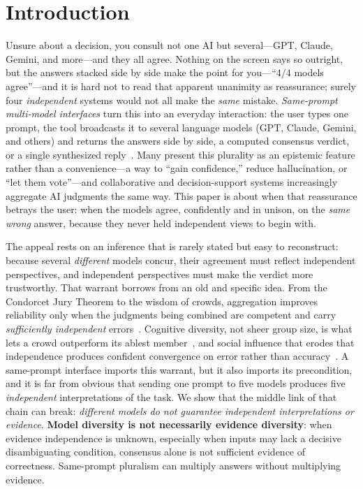 \documentclass[acmsmall,screen,review,anonymous]{acmart}
\begin{document}
\section{Introduction}
\label{sec:intro}
Unsure about a decision, you consult not one AI but several---GPT, Claude, Gemini, and more---and they all
agree. Nothing on the screen says so outright, but the answers stacked side by side make the point for
you---``$4/4$ models agree''---and it is hard not to read that apparent unanimity
as reassurance; surely four \emph{independent} systems would not all make the \emph{same} mistake.
\emph{Same-prompt multi-model interfaces} turn this into an everyday interaction: the user types one prompt,
the tool broadcasts it to several language models (GPT, Claude, Gemini, and others) and returns the answers
side by side, a computed consensus verdict, or a single synthesized
reply~\cite{chathub2026,openwebui2026multimodel,promptquorum2026home,multiplechat2026,poe2024multibot,googleaistudio2024compare}.
Many present this plurality as an epistemic feature rather than a convenience---a way to ``gain confidence,''
reduce hallucination, or ``let them vote''---and collaborative and decision-support systems increasingly
aggregate AI judgments the same way. This paper is about when that reassurance betrays the user: when the
models agree, confidently and in unison, on the \emph{same wrong} answer, because they never held independent
views to begin with.

The appeal rests on an inference that is rarely stated but easy to reconstruct: because several
\emph{different} models concur, their agreement must reflect independent perspectives, and independent
perspectives must make the verdict more trustworthy. That warrant borrows from an old and
specific idea. From the Condorcet Jury Theorem to the wisdom of crowds, aggregation improves reliability
only when the judgments being combined are competent and carry \emph{sufficiently independent}
errors~\cite{condorcet,ladha1992}. Cognitive diversity, not sheer group size, is
what lets a crowd outperform its ablest member~\cite{hongpage2004}, and social influence that erodes that
independence produces confident convergence on error rather than accuracy~\cite{lorenz2011}. A same-prompt interface imports this warrant,
but it also imports its precondition, and it is far from obvious that sending one prompt to five models
produces five \emph{independent} interpretations of the task. We show that the middle link of that chain can
break: \emph{different models do not guarantee independent interpretations or evidence}. \textbf{Model diversity is not necessarily evidence diversity}: when evidence
independence is unknown, especially when inputs may lack a decisive disambiguating condition, consensus alone
is not sufficient evidence of correctness. Same-prompt pluralism can multiply answers without multiplying evidence.
\end{document}
